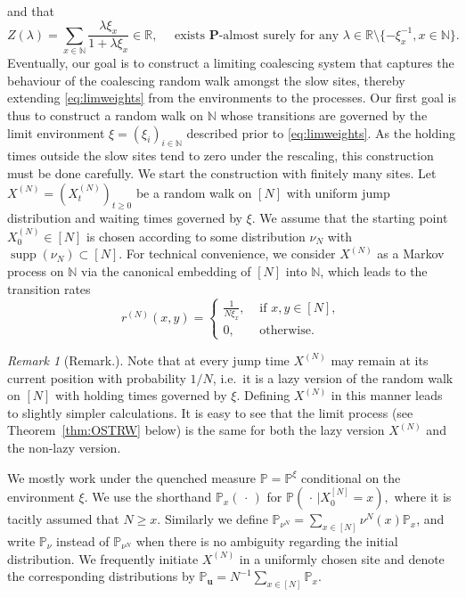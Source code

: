 \documentclass[11pt,a4paper]{scrartcl}
\numberwithin{equation}{section}
\theoremstyle{plain}
\theoremstyle{definition}
\theoremstyle{remark}
\newtheorem{remark}[theorem]{Remark}
\DeclareMathOperator{\supp}{supp}
\newcommand{\bN}{\ensuremath{\mathbb{N}}}
\newcommand{\bP}{\ensuremath{\mathbb{P}}}
\newcommand{\bR}{\ensuremath{\mathbb{R}}}
\newcommand{\bPu}{\bP_\mathbf{u}}
\newcommand{\bfP}{\mathbf{P}}
\begin{document}
and that 
$$
\label{eq:xilambdasum}
Z(\lambda)=\sum_{x\in\bN}\frac{\lambda \xi_x}{1+\lambda\xi_x}\in\bR,\quad \text{ exists }\bfP\text{-almost surely for any }\lambda\in\bR\setminus\{-\xi_{x}^{-1},x\in\bN\}.
$$
Eventually, our goal is to construct a limiting coalescing system that captures the behaviour of the coalescing random walk amongst the slow sites, thereby extending \eqref{eq:limweights} from the environments to the processes. Our first goal is thus to construct a random walk on $\bN$ whose transitions are governed by the limit environment $\xi=(\xi_i)_{i\in\bN}$ described prior to \eqref{eq:limweights}. As the holding times outside the slow sites tend to zero under the rescaling, this construction must be done carefully.
We start the construction with finitely many sites. Let $X^{(N)}=(X_t^{(N)})_{t\geq0}$ be a random walk on $[N]$ with uniform jump distribution and waiting times governed by $\xi$. We assume that the starting point $X_0^{(N)}\in [N]$ is chosen according to some distribution $\nu_N$ with $\supp(\nu_N)\subset[N]$. For technical convenience, we consider $X^{(N)}$ as a Markov process on $\bN$ via the canonical embedding of $[N]$ into $\bN$, which leads to the transition rates
$$
r^{(N)}(x,y)=\begin{cases}
	 \frac{1}{N\xi_x}, & \text{ if }x,y\in[N],\\
	 0, & \text{ otherwise.}
\end{cases}
$$
\begin{remark}[Remark.]
Note that at every jump time $X^{(N)}$ may remain at its current position with probability $1/N$, i.e.\ it is a lazy version of the random walk on $[N]$ with holding times governed by $\xi$. Defining $X^{(N)}$ in this manner leads to slightly simpler calculations. It is easy to see that the limit process (see  Theorem~\ref{thm:OSTRW} below) is the same for both the lazy version $X^{(N)}$ and the non-lazy version.
\end{remark}
We mostly work under the quenched measure $\bP=\bP^\xi$ conditional on the environment $\xi$. We use the shorthand $\bP_x(\,\cdot\,)$ for $\bP(\,\cdot \,|X^{[N]}_0=x),$ where it is tacitly assumed that $N\geq x$. Similarly we define $\bP_{\nu^N}=\sum_{x\in[N]}\nu^N(x)\bP_x$, and write $\bP_\nu$ instead of $\bP_{\nu^N}$ when there is no ambiguity regarding the initial distribution. We frequently initiate $X^{(N)}$ in a uniformly chosen site and denote the corresponding distributions by $\bPu=N^{-1}\sum_{x\in[N]}\bP_x.$
\end{document}
